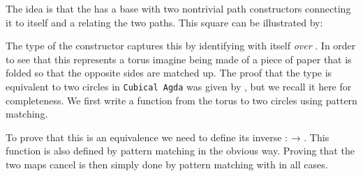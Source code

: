The idea is that the  has a base  with two
nontrivial path constructors connecting it to itself and a
 relating the two paths. This square can be illustrated
by:
%
\begin{center}
\end{center}

The type of the  constructor captures this by identifying
 with itself \emph{over} .  In order to see that
this represents a torus imagine  being made of a piece of
paper that is folded so that the opposite sides are matched up.  The
proof that the  type is equivalent to two circles in
\texttt{Cubical Agda} was given by ,
but we recall it here for completeness. We first write a function from
the torus to two circles using pattern matching.
%

To prove that this is an equivalence we need to define its inverse
 :    → . This
function is also defined by pattern matching in the obvious
way. Proving that the two maps cancel is then simply done by
pattern matching with  in all cases.
%

